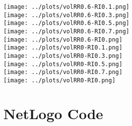 \documentclass[a4paper, 11pt]{report}
\begin{document}
\texttt{[image: ../plots/volRR0.6-RI0.1.png]}\\
\texttt{[image: ../plots/volRR0.6-RI0.3.png]}\\
\texttt{[image: ../plots/volRR0.6-RI0.5.png]}\\
\texttt{[image: ../plots/volRR0.6-RI0.7.png]}\\
\texttt{[image: ../plots/volRR0.6-RI0.png]}\\
\texttt{[image: ../plots/volRR0-RI0.1.png]}\\
\texttt{[image: ../plots/volRR0-RI0.3.png]}\\
\texttt{[image: ../plots/volRR0-RI0.5.png]}\\
\texttt{[image: ../plots/volRR0-RI0.7.png]}\\
\texttt{[image: ../plots/volRR0-RI0.png]}\\



\section*{NetLogo Code}
\label{append:netlogo}

	
\end{document}
